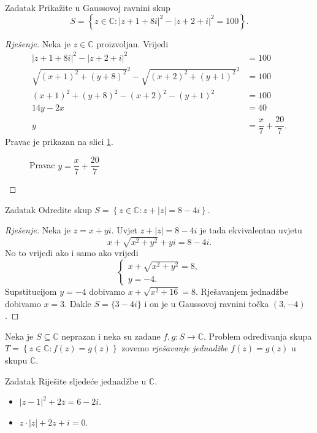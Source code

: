 \begin{exercise}{Zadatak}
Prikažite u Gaussovoj ravnini skup 
\[S=\left\{z\in \mathbb{C} : |z+1+8i|^2-|z+2+i|^2=100\right\}.\]
\end{exercise}
\begin{proof}[Rješenje]
Neka je \(z\in \mathbb{C}\) proizvoljan. Vrijedi
\begin{align*}
|z+1+8i|^2-|z+2+i|^2&=100\\
\sqrt{(x+1)^2+(y+8)^2}^2-\sqrt{(x+2)^2+(y+1)^2}^2&=100\\
(x+1)^2+(y+8)^2-(x+2)^2-(y+1)^2&=100\\
14y-2x&=40\\
y&=\dfrac{x}{7}+\dfrac{20}{7}.
\end{align*}
Pravac je prikazan na slici \ref{pravac}.
\newpage
\begin{figure}[ht]
\begin{center}
\end{center}
\caption{Pravac \(y=\dfrac{x}{7}+\dfrac{20}{7}\)}
\label{pravac}
\end{figure}
\end{proof}
\begin{exercise}{Zadatak}
Odredite skup \(S=\left\{z\in \mathbb{C} : z+|z|=8-4i\right\}\).
\end{exercise}
\begin{proof}[Rješenje]
Neka je \(z=x+yi\). Uvjet \(z+|z|=8-4i\) je tada ekvivalentan uvjetu
\[x+\sqrt{x^2+y^2}+yi=8-4i.\] No to vrijedi ako i samo ako vrijedi
\[\begin{cases}
x+\sqrt{x^2+y^2}=8,\\
y=-4.
\end{cases}\]
Supstitucijom \(y=-4\) dobivamo \(x+\sqrt{x^2+16}=8\). Rješavanjem jednadžbe dobivamo \(x=3\). Dakle \(S=\{3-4i\}\) i on je u Gaussovoj ravnini točka \((3, -4)\).
\end{proof}
Neka je \(S\subseteq \mathbb{C}\) neprazan i neka su zadane \(f, g : S\to \mathbb{C}\). Problem određivanja skupa \(T=\left\{z\in \mathbb{C} : f(z)=g(z)\right\}\) zovemo \textit{rješavanje jednadžbe} \(f(z)=g(z)\) u skupu \(\mathbb{C}\).
\begin{exercise}{Zadatak} Riješite sljedeće jednadžbe u \(\mathbb{C}\).
\begin{itemize}
\item[a)] \(|z-1|^2+2\overline{z}=6-2i\).
\item[b)] \(z\cdot |z|+2z+i=0.\)
\end{itemize}
\end{exercise}
